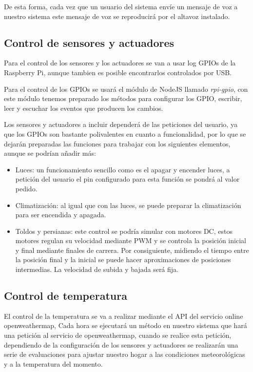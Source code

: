 \documentclass[10pt,journal,compsoc]{IEEEtran}
\begin{document}
De esta forma, cada vez que un usuario del sistema envíe un mensaje de voz a 
nuestro sistema este mensaje de voz se reproducirá por el altavoz instalado.

\subsection{Control de sensores y actuadores}
Para el control de los sensores y los actuadores se van a usar log GPIOs de la 
Raspberry Pi, aunque tambien es posible encontrarlos controlados por USB.

Para el control de los GPIOs se usará el módulo de NodeJS llamado 
\textit{rpi-gpio}, con este módulo tenemos preparado los métodos para configurar 
los GPIO, escribir, leer y escuchar los eventos que producen los cambios.

Los sensores y actuadores a incluir dependerá de las peticiones del usuario, ya 
que los GPIOs son bastante polivalentes en cuanto a funcionalidad, por lo que se 
dejarán preparadas las funciones para trabajar con los siguientes elementos, 
aunque se podrían añadir más:

\begin{itemize}
  \item Luces: un funcionamiento sencillo como es el apagar y encender luces, a 
  petición del usuario el pin configurado para esta función se pondrá al valor 
  pedido.
  \item Climatización: al igual que con las luces, se puede preparar la 
  climatización para ser encendida y apagada.
  \item Toldos y persianas: este control se podría simular con motores DC, estos 
  motores regulan su velocidad mediante PWM y se controla la posición inicial y 
  final mediante finales de carrera. 
  Por consiguiente, midiendo el tiempo entre la 
  posición final y la inicial se puede hacer aproximaciones de posiciones 
  intermedias. La velocidad de subida y bajada será fija.
\end{itemize}

\subsection{Control de temperatura}
El control de la temperatura se va a realizar mediante el API del servicio online openweathermap, 
Cada hora se ejecutará un método en nuestro sistema que hará una petición al 
servicio de openweathermap, cuando se realice esta petición, dependiendo de la 
configuración de los sensores y actuadores se realizarán una serie de 
evaluaciones para ajustar nuestro hogar a las condiciones meteorológicas y a la 
temperatura del momento.
\end{document}
